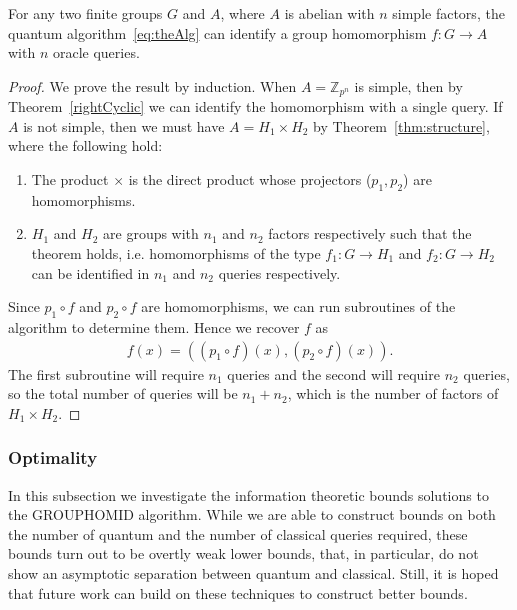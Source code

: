 \begin{theorem}\label{thm:intoAbThm}
For any two finite groups $G$ and $A$, where $A$ is abelian with $n$ simple factors, the quantum algorithm~\eqref{eq:theAlg} can identify a group homomorphism $f:G \to A$ with $n$ oracle queries.
\end{theorem}
\begin{proof}
We prove the result by induction. 
\newline\newline
{} When $A=\mathbb{Z}_{p^n}$ is simple, then by Theorem~\ref{rightCyclic} we can identify the homomorphism with a single query.
\newline\newline
{} If $A$ is not simple, then we must have $A=H_1\times H_2$ by Theorem~\ref{thm:structure}, where the following hold:
\begin{enumerate}

\item The product $\times$ is the direct product whose projectors ($p_1,p_2$) are homomorphisms.

\item  $H_1$ and $H_2$ are groups with $n_1$ and $n_2$ factors respectively such  that the theorem holds, i.e. homomorphisms of the type $f_{1}:G\to H_1$ and $f_{2}:G\to H_2$  can be identified in $n_1$ and $n_2$ queries respectively.

\end{enumerate} 
Since $p_1\circ f$ and $p_2\circ f$ are homomorphisms, we can run subroutines of the algorithm to determine them. Hence we recover $f$ as
\begin{align*}
f(x) = ( (p_1\circ f)(x),(p_2\circ f)(x) ).
\end{align*}
The first subroutine will require $n_1$ queries and the second will require $n_2$ queries, so the total number of queries will be $n_1+n_2$, which is the number of factors of $H_1\times H_2$.
\end{proof}


\subsubsection*{Optimality}
In this subsection we investigate the information theoretic bounds solutions to the GROUPHOMID algorithm.  While we are able to construct bounds on both the number of quantum and the number of classical queries required, these bounds turn out to be overtly weak lower bounds, that, in particular, do not show an asymptotic separation between quantum and classical.  Still, it is hoped that future work can build on these techniques to construct better bounds. 


